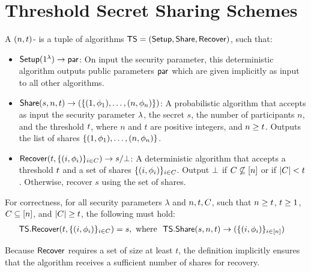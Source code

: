 

\section{Threshold Secret Sharing Schemes} \label{tss}

\begin{definition}
  A $(n, t)$- is a tuple of
  algorithms   $\mathsf{TS}=(\mathsf{Setup}, \mathsf{Share}, \mathsf{Recover})$, such that:
  \begin{itemize}
    \item  $\mathsf{Setup}(1^\lambda) \rightarrow \mathsf{par}$: On input the security parameter,
      this deterministic algorithm outputs public parameters $\mathsf{par}$ which are given implicitly as input to all other algorithms.

    \item $\mathsf{Share}(s, n, t) \rightarrow (\{ (1, \phi_1), \ldots, (n, \phi_n)\})$:
      A probabilistic algorithm that accepts as input
      the security parameter $\lambda$,
      the secret $s$,
      the number of participants $n$, and the threshold $t$,
      where $n$ and $t$ are positive integers, and $n \geq t$.
      Outputs the list of shares $\{ (1, \phi_1), \ldots, (n, \phi_n) \}$.

    \item $\mathsf{Recover}(t, \{ (i, \phi_i)\}_{ i \in C}) \rightarrow s/\bot$:
      A deterministic algorithm that accepts a threshold $t$ and a set of shares $\{(i, \phi_i) \}_{i \in C}$.
      Output $\bot$ if $C \not\subseteq [n]$ or if $\lvert C \rvert < t$.
      Otherwise, recover $s$ using the set of shares.
\end{itemize}
\end{definition}

For correctness, for all security parameters $\lambda$ and $n, t, C$,
      such that $n \geq t$,
      $t \geq 1$,
      $C \subseteq [n]$,
      and $\lvert C \rvert \geq t$,
      the following must hold:
    \begin{align*}
      & \mathsf{TS}.\mathsf{Recover}(t, \{ (i, \phi_i)\}_{ i \in C}) = s,
      \text{ where }   \
       \mathsf{TS}.\mathsf{Share}(s, n, t) \rightarrow ( \{ (i, \phi_i) \}_{i \in [n]})
    \end{align*}

\begin{remark}
Because $\mathsf{Recover}$ requires a set of size at least $t$,
the definition implicitly ensures that the algorithm receives a sufficient
number of shares for recovery.
\end{remark}

